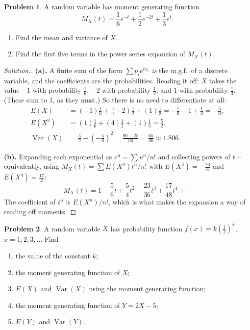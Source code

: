 \documentclass[12pt,a4paper]{report}
\theoremstyle{definition}
\theoremstyle{plain}
\theoremstyle{definition}
\newtheorem{problemx}{Problem}[section]
\newenvironment{problem}{\begin{problemx}}{\end{problemx}}
\newenvironment{solution}
  {\renewcommand{\qedsymbol}{}\begin{proof}[\textit{Solution}.]}
  {\end{proof}}
\begin{document}
\begin{problem}
A random variable has moment generating function
\[M_X(t) = \frac{1}{6}e^{-t}+\frac{1}{2}e^{-2t}+\frac{1}{3}e^{t}.\]
\begin{enumerate}
\item[(a).] Find the mean and variance of $X$.
\item[(b).] Find the first five terms in the power series expansion of $M_X(t)$.
\end{enumerate}
\end{problem}

\begin{solution}
\textbf{(a).} A finite sum of the form $\sum p_i e^{tx_i}$ \emph{is} the m.g.f.\ of a
discrete variable, and the coefficients are the probabilities. Reading it off:
$X$ takes the value $-1$ with probability $\tfrac16$, $-2$ with probability $\tfrac12$,
and $1$ with probability $\tfrac13$. (These sum to 1, as they must.) So there is no need
to differentiate at all:
\begin{align*}
E(X) &= (-1)\tfrac16+(-2)\tfrac12+(1)\tfrac13 = -\tfrac16-1+\tfrac13 = -\tfrac56,\\
E(X^2) &= (1)\tfrac16+(4)\tfrac12+(1)\tfrac13 = \tfrac52,\\
\operatorname{Var}(X) &= \tfrac52-\left(-\tfrac56\right)^{2} = \tfrac{90-25}{36}
 = \frac{65}{36} \approx 1.806.
\end{align*}

\textbf{(b).} Expanding each exponential as $e^{u} = \sum u^n/n!$ and collecting powers
of $t$ -- equivalently, using $M_X(t) = \sum E(X^n)t^n/n!$ with
$E(X^3) = -\tfrac{23}{6}$ and $E(X^4) = \tfrac{17}{2}$:
\[M_X(t) = 1-\frac{5}{6}t+\frac{5}{4}t^{2}-\frac{23}{36}t^{3}+\frac{17}{48}t^{4}+\cdots\]
The coefficient of $t^n$ is $E(X^n)/n!$, which is what makes the expansion a way of
reading off moments.
\end{solution}

\begin{problem}
A random variable $X$ has probability function
$f(x) = k\left(\frac{1}{2}\right)^{x}$, $x = 1,2,3,\ldots$ Find
\begin{enumerate}
\item[(a).] the value of the constant $k$;
\item[(b).] the moment generating function of $X$;
\item[(c).] $E(X)$ and $\operatorname{Var}(X)$ using the moment generating function;
\item[(d).] the moment generating function of $Y = 2X-5$;
\item[(e).] $E(Y)$ and $\operatorname{Var}(Y)$.
\end{enumerate}
\end{problem}
\end{document}
